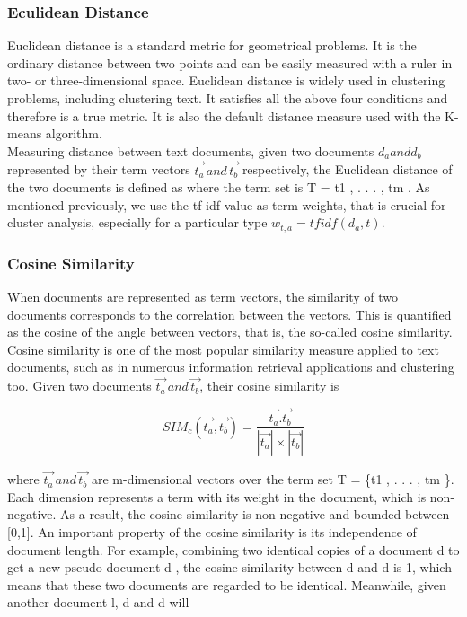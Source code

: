 \subsubsection{Eculidean Distance}
Euclidean distance is a standard metric for geometrical problems. It is the ordinary distance between two points and can be easily measured with a ruler in two- or three-dimensional space. Euclidean distance is widely used in clustering problems, including clustering text. It satisfies all the above four conditions and therefore is a true metric. It is also the default distance measure used with the K-means algorithm.\\
Measuring distance between text documents, given two documents $d_{a} and  d_{b}$ represented by their term vectors  $\overrightarrow{t_{a}} \,and\, \overrightarrow{t_{b}}$ respectively, the Euclidean distance of the two documents is defined as
where the term set is T = {t1 , . . . , tm }. As mentioned previously, we use the tf idf value as term weights, that is
crucial for cluster analysis, especially for a particular type $w_{t,a} = tf idf (d_{a} , t)$.


\subsubsection{Cosine Similarity}
When documents are represented as term vectors, the similarity of two documents corresponds to the correlation between the vectors. This is quantified as the cosine of the angle between vectors, that is, the so-called cosine similarity. Cosine similarity is one of the most popular similarity measure applied to text documents, such as in numerous information retrieval applications and clustering too.
Given two documents $\overrightarrow{t_{a}} \,and\, \overrightarrow{t_{b}}$, their cosine similarity is

\begin{equation}
SIM_{c}(\vec{t_{a}},\vec{t_{b}}) =\frac{\vec{t_{a}}.\vec{t_{b}}}{|\vec{t_{a}}|\times|\vec{t_{b}}|}
\end{equation}

where $\overrightarrow{t_{a}} \,and\, \overrightarrow{t_{b}}$ are m-dimensional vectors over the term set T = \{t1 , . . . , tm \}. Each dimension represents a term with its weight in the document, which is non-negative. As a result, the cosine similarity is non-negative and bounded between [0,1].
An important property of the cosine similarity is its independence of document length. For example, combining two identical copies of a document d to get a new pseudo document d , the cosine similarity between d and d is 1, which means that these two documents are regarded to be identical. Meanwhile, given another document l, d and d will



